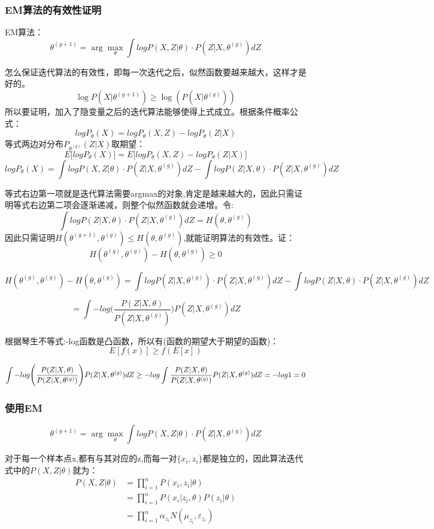 \documentclass[UTF8]{ctexart} %
\begin{document}
		\subsubsection{EM算法的有效性证明}
			EM算法：
			\[\theta^{(g+1)} = \arg\max_{\theta}\int logP(X,Z|\theta)\cdot P(Z|X,\theta^{(g)})dZ\]
			
			怎么保证迭代算法的有效性，即每一次迭代之后，似然函数要越来越大，这样才是好的。
			\[\log P(X  |\theta^{(g+1)}) \geq \log(P(X|\theta^{(g)}))\]
			所以要证明，加入了隐变量之后的迭代算法能够使得上式成立。根据条件概率公式：
			\[logP_\theta(X) = logP_\theta(X,Z) - logP_\theta(Z|X)\]
			等式两边对分布$P_{\theta^{(g)}}(Z|X)$取期望：
			\[E\big[logP_\theta(X)\big] = E\big[logP_\theta(X,Z) - logP_\theta(Z|X)\big]\]
			\[logP_\theta(X) = \int logP(X,Z|\theta)\cdot P(Z|X,\theta^{(g)})dZ-
			\int logP(Z|X,\theta)\cdot P(Z|X,\theta^{(g)})dZ \]
			
			等式右边第一项就是迭代算法需要argmax的对象,肯定是越来越大的，因此只需证明等式右边第二项会逐渐递减，则整个似然函数就会递增。令:
			\[\int logP(Z|X,\theta)\cdot P(Z|X,\theta^{(g)})dZ = H(\theta, \theta^{(g)})\]
			因此只需证明$H(\theta^{(g+1)}, \theta^{(g)}) \leq  H(\theta, \theta^{(g)})$,就能证明算法的有效性。证：
			\[H(\theta^{(g)}, \theta^{(g)}) -  H(\theta, \theta^{(g)})\geq 0\]
			
			\[
			H(\theta^{(g)}, \theta^{(g)}) -  H(\theta, \theta^{(g)})=\int logP(Z|X,\theta^{(g)})\cdot P(Z|X,\theta^{(g)})dZ-\int logP(Z|X,\theta)\cdot P(Z|X,\theta^{(g)})dZ\]
			
			\[=\int-log\Bigg(\frac{P(Z|X,\theta)}{P(Z|X,\theta^{(g)})}\Bigg)P(Z|X,\theta^{(g)})dZ
			\]

			根据琴生不等式:-log函数是凸函数，所以有(函数的期望大于期望的函数)：
			\[E[f(x)]\geq f(E[x])\]
			
			\[\int-log\Bigg(\frac{P(Z|X,\theta)}{P(Z|X,\theta^{(g)})}\Bigg)P(Z|X,\theta^{(g)})dZ \\
			\geq -log\int\frac{P(Z|X,\theta)}{P(Z|X,\theta^{(g)})}P(Z|X,\theta^{(g)})dZ = -log1=0
			\]
			
		\subsubsection{使用EM}
			\[\theta^{(g+1)} = \arg\max_{\theta}\int logP(X,Z|\theta)\cdot P(Z|X,\theta^{(g)})dZ\]
			
			对于每一个样本点x,都有与其对应的z,而每一对$\{x_i,z_i\}$都是独立的，因此算法迭代式中的$P(X,Z|\theta)$就为：
			\[\begin{aligned}
			P(X,Z|\theta) &= \prod_{i=1}^n P(x_i,z_i|\theta) \\
			&= \prod_{i=1}^n P(x_i|z_i,\theta)P(z_i|\theta)\\
			&= \prod_{i=1}^n \alpha_{z_i} N(\mu_{z_i},\varepsilon_{z_i})
			\end{aligned}\]
			
\end{document}
